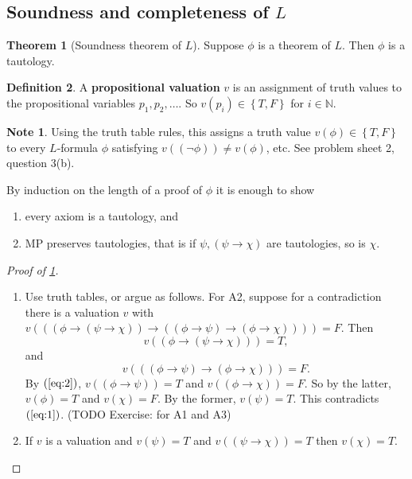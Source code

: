 \documentclass{article}
\newcommand{\N}{\mathbb{N}}
\newcommand{\rb}[1]{\left( #1 \right)}
\newcommand{\cb}[1]{\left\{ #1 \right\}}
\newcommand{\notb}[1]{\rb{\neg #1}}
\newcommand{\impb}[2]{\rb{#1 \rightarrow #2}}
\theoremstyle{definition}\newtheorem{definition}{Definition}[subsection]
\theoremstyle{definition}\newtheorem{remark}[definition]{Remark}
\theoremstyle{definition}\newtheorem*{example}{Example}
\theoremstyle{definition}\newtheorem*{note}{Note}
\newtheorem{theorem}[definition]{Theorem}
\begin{document}

\subsection{Soundness and completeness of $ L $}

\begin{theorem}[Soundness theorem of $ L $]
\label{thm:1.3.1}
Suppose $ \phi $ is a theorem of $ L $. Then $ \phi $ is a tautology.
\end{theorem}

\begin{definition}
A \textbf{propositional valuation} $ v $ is an assignment of truth values to the propositional variables $ p_1, p_2, \dots $. So $ v\rb{p_i} \in \cb{T, F} $ for $ i \in \N $.
\end{definition}

\begin{note}
Using the truth table rules, this assigns a truth value $ v\rb{\phi} \in \cb{T, F} $ to every $ L $-formula $ \phi $ satisfying $ v\rb{\notb{\phi}} \ne v\rb{\phi} $, etc. See problem sheet 2, question 3(b).
\end{note}

By induction on the length of a proof of $ \phi $ it is enough to show
\begin{enumerate}
\item every axiom is a tautology, and
\item MP preserves tautologies, that is if $ \psi, \impb{\psi}{\chi} $ are tautologies, so is $ \chi $.
\end{enumerate}

\begin{proof}[Proof of \ref{thm:1.3.1}]
\hfill
\begin{enumerate}
\item Use truth tables, or argue as follows. For A2, suppose for a contradiction there is a valuation $ v $ with $ v\rb{\impb{\impb{\phi}{\impb{\psi}{\chi}}}{\impb{\impb{\phi}{\psi}}{\impb{\phi}{\chi}}}} = F $. Then
\begin{equation}
\label{eq:1}
v\rb{\impb{\phi}{\impb{\psi}{\chi}}} = T,
\end{equation}
and
\begin{equation}
\label{eq:2}
v\rb{\impb{\impb{\phi}{\psi}}{\impb{\phi}{\chi}}} = F.
\end{equation}
By $ \rb{\ref{eq:2}} $, $ v\rb{\impb{\phi}{\psi}} = T $ and $ v\rb{\impb{\phi}{\chi}} = F $. So by the latter, $ v\rb{\phi} = T $ and $ v\rb{\chi} = F $. By the former, $ v\rb{\psi} = T $. This contradicts $ \rb{\ref{eq:1}} $. (TODO Exercise: for A1 and A3)
\item If $ v $ is a valuation and $ v\rb{\psi} = T $ and $ v\rb{\impb{\psi}{\chi}} = T $ then $ v\rb{\chi} = T $.
\end{enumerate}
\end{proof}
\end{document}
